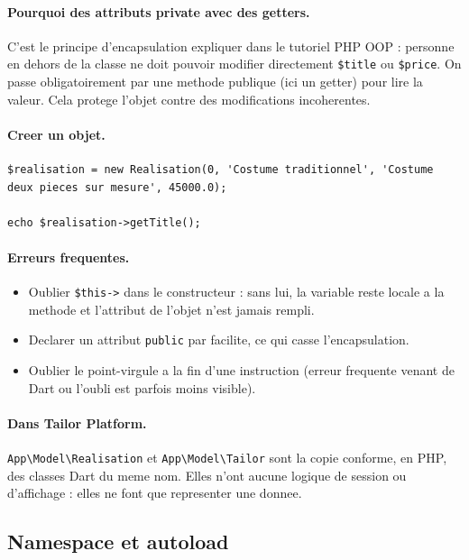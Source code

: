 \documentclass[11pt,a4paper]{article}
\begin{document}
\paragraph{Pourquoi des attributs private avec des getters.}
C'est le principe d'encapsulation expliquer dans le tutoriel PHP OOP :
personne en dehors de la classe ne doit pouvoir modifier directement
\verb|$title| ou \verb|$price|. On passe obligatoirement par une methode
publique (ici un getter) pour lire la valeur. Cela protege l'objet contre
des modifications incoherentes.

\paragraph{Creer un objet.}

\begin{lstlisting}
$realisation = new Realisation(0, 'Costume traditionnel', 'Costume deux pieces sur mesure', 45000.0);

echo $realisation->getTitle();
\end{lstlisting}

\paragraph{Erreurs frequentes.}
\begin{itemize}
  \item Oublier \verb|$this->| dans le constructeur : sans lui, la variable
  reste locale a la methode et l'attribut de l'objet n'est jamais rempli.
  \item Declarer un attribut \verb|public| par facilite, ce qui casse
  l'encapsulation.
  \item Oublier le point-virgule a la fin d'une instruction (erreur
  frequente venant de Dart ou l'oubli est parfois moins visible).
\end{itemize}

\paragraph{Dans Tailor Platform.}
\verb|App\Model\Realisation| et \verb|App\Model\Tailor| sont la copie
conforme, en PHP, des classes Dart du meme nom. Elles n'ont aucune logique
de session ou d'affichage : elles ne font que representer une donnee.

\subsection{Namespace et autoload}
\end{document}
